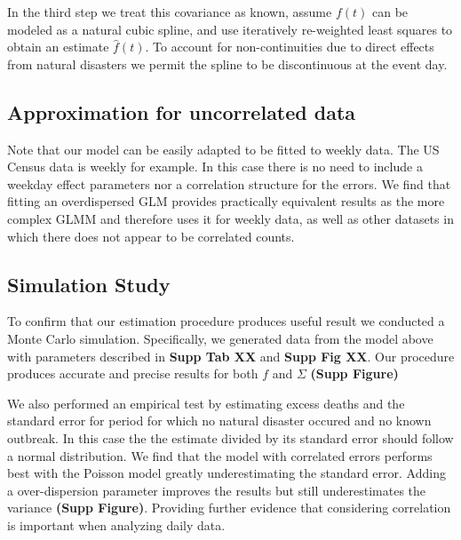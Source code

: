 \documentclass[11pt]{article}
\begin{document}
In the third step we treat this covariance as known, assume $f(t)$ can be modeled as a natural cubic spline, and use iteratively re-weighted least squares to obtain an estimate $\hat{f}(t)$. To account for non-continuities due to direct effects from natural disasters we permit the spline to be discontinuous at the event day. 

\subsection{Approximation for uncorrelated data}
Note that our model can be easily adapted to be fitted to weekly data. The US Census data is weekly for example. In this case there is no need to include a weekday effect parameters nor a correlation structure for the errors. We find that fitting an overdispersed GLM provides practically equivalent results as the more complex GLMM and therefore uses it for weekly data, as well as other datasets in which there does not appear to be correlated counts. 

\subsection{Simulation Study}
To confirm that our estimation procedure produces useful result we conducted a Monte Carlo simulation. Specifically, we generated data from the model above with parameters described in \textbf{Supp Tab XX} and \textbf{Supp Fig XX}. Our procedure produces accurate and precise results for both $f$ and $\Sigma$ \textbf{(Supp Figure)}

We also performed an empirical test by estimating excess deaths and the standard error for period for which no natural disaster occured and no known outbreak. In this case the the estimate divided by its standard error should follow a normal distribution.  We find that the model with correlated errors performs best with the Poisson model greatly underestimating the standard error. Adding a over-dispersion parameter improves the results but still underestimates the variance \textbf{(Supp Figure)}. Providing further evidence that considering correlation is important when analyzing daily data.
\end{document}
